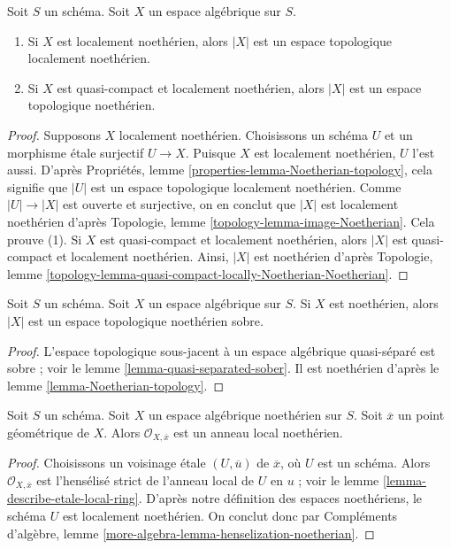 \begin{lemma}
\label{lemma-Noetherian-topology}
Soit $S$ un schéma. Soit $X$ un espace algébrique sur $S$.
\begin{enumerate}
\item Si $X$ est localement noethérien, alors $|X|$ est un espace topologique
localement noethérien.
\item Si $X$ est quasi-compact et localement noethérien, alors $|X|$
est un espace topologique noethérien.
\end{enumerate}
\end{lemma}

\begin{proof}
Supposons $X$ localement noethérien.
Choisissons un schéma $U$ et un morphisme \'etale surjectif
$U \to X$. Puisque $X$ est localement noethérien, $U$ l'est aussi.
D'après
Propriétés, lemme \ref{properties-lemma-Noetherian-topology},
cela signifie que $|U|$ est un espace topologique localement noethérien.
Comme $|U| \to |X|$ est ouverte et surjective, on en conclut que
$|X|$ est localement noethérien d'après
Topologie, lemme \ref{topology-lemma-image-Noetherian}.
Cela prouve (1). Si $X$ est quasi-compact et localement noethérien,
alors $|X|$ est quasi-compact et localement noethérien. Ainsi, $|X|$
est noethérien d'après
Topologie,
lemme \ref{topology-lemma-quasi-compact-locally-Noetherian-Noetherian}.
\end{proof}

\begin{lemma}
\label{lemma-Noetherian-sober}
Soit $S$ un schéma. Soit $X$ un espace algébrique sur $S$.
Si $X$ est noethérien, alors $|X|$ est un espace topologique noethérien sobre.
\end{lemma}

\begin{proof}
L'espace topologique sous-jacent à un espace algébrique quasi-séparé
est sobre ; voir le
lemme \ref{lemma-quasi-separated-sober}.
Il est noethérien d'après le
lemme \ref{lemma-Noetherian-topology}.
\end{proof}

\begin{lemma}
\label{lemma-Noetherian-local-ring-Noetherian}
Soit $S$ un schéma. Soit $X$ un espace algébrique noethérien sur $S$.
Soit $\overline{x}$ un point géométrique de $X$. Alors
$\mathcal{O}_{X, \overline{x}}$ est un anneau local noethérien.
\end{lemma}

\begin{proof}
Choisissons un voisinage \'etale $(U, \overline{u})$ de $\overline{x}$,
où $U$ est un schéma. Alors $\mathcal{O}_{X, \overline{x}}$ est
l'hensélisé strict de l'anneau local de $U$ en $u$ ; voir le
lemme \ref{lemma-describe-etale-local-ring}.
D'après notre définition des espaces noethériens, le schéma $U$ est localement noethérien.
On conclut donc par
Compléments d'algèbre, lemme \ref{more-algebra-lemma-henselization-noetherian}.
\end{proof}








